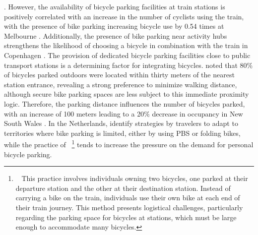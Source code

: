 \begin{refsegment}
{} \textcolor{blue}{\autocite[400]{la_paix_puello_integration_2016}}. However, the availability of bicycle parking facilities at train stations is positively correlated with an increase in the number of cyclists using the train, with the presence of bike parking increasing bicycle use by 0.54 times at Melbourne \textcolor{blue}{\autocite[401]{weliwitiya_bicycle_2019}}. Additionally, the presence of bike parking near activity hubs strengthens the likelihood of choosing a bicycle in combination with the train in Copenhagen \textcolor{blue}{\autocite[24]{halldorsdottir_home-end_2017}}. The provision of dedicated bicycle parking facilities close to public transport stations is a determining factor for integrating bicycles. \textcolor{blue}{\textcite[8, 19]{arbis_analysis_2016}} noted that 80\% of bicycles parked outdoors were located within thirty meters of the nearest station entrance, revealing a strong preference to minimize walking distance, although secure bike parking spaces are less subject to this immediate proximity logic. Therefore, the parking distance influences the number of bicycles parked, with an increase of 100 meters leading to a 20\% decrease in occupancy in New South Wales \textcolor{blue}{\autocite[15]{arbis_analysis_2016}}. In the Netherlands, \textcolor{blue}{\textcite[10]{jonkeren_bicycle_2021}} identify strategies by travelers to adapt to territories where bike parking is limited, either by using \acrshort{PBS} or folding bikes, while the practice of ~\footnote{~
    This practice involves individuals owning two bicycles, one parked at their departure station and the other at their destination station. Instead of carrying a bike on the train, individuals use their own bike at each end of their train journey. This method presents logistical challenges, particularly regarding the parking space for bicycles at stations, which must be large enough to accommodate many bicycles.
} tends to increase the pressure on the demand for personal bicycle parking.%


\end{refsegment}
